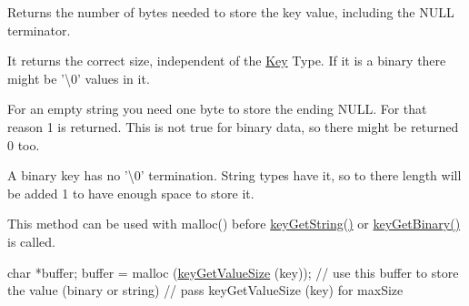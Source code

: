 Returns the number of bytes needed to store the key value, including the N\-U\-L\-L terminator.

It returns the correct size, independent of the \hyperlink{classkdb_1_1Key}{Key} Type. If it is a binary there might be '\textbackslash{}0' values in it.

For an empty string you need one byte to store the ending N\-U\-L\-L. For that reason 1 is returned. This is not true for binary data, so there might be returned 0 too.

A binary key has no '\textbackslash{}0' termination. String types have it, so to there length will be added 1 to have enough space to store it.

This method can be used with malloc() before \hyperlink{group__keyvalue_ga41b9fac5ccddafe407fc0ae1e2eb8778}{key\-Get\-String()} or \hyperlink{group__keyvalue_ga4c0d8a4a11174197699c231e0b5c3c84}{key\-Get\-Binary()} is called.


\begin{DoxyCode}
\textcolor{keywordtype}{char} *buffer;
buffer = malloc (\hyperlink{group__keyvalue_gae326672fffb7474abfe9baf53b73217e}{keyGetValueSize} (key));
\textcolor{comment}{// use this buffer to store the value (binary or string)}
\textcolor{comment}{// pass keyGetValueSize (key) for maxSize}
\end{DoxyCode}



